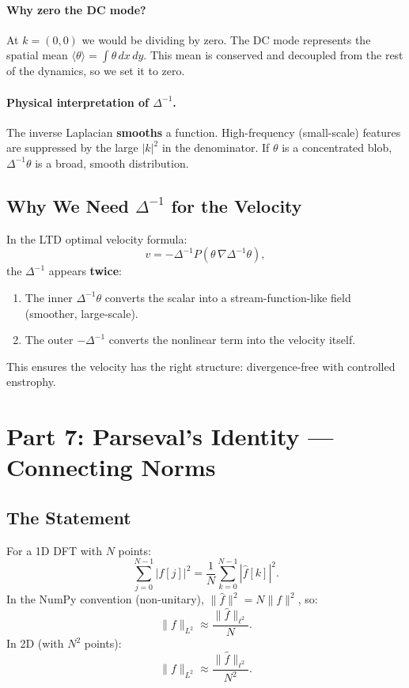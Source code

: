 \documentclass[12pt,a4paper]{article}
\newcommand{\lapinv}{\Delta^{-1}}
\theoremstyle{definition}
\begin{document}
\paragraph{Why zero the DC mode?}
At $k=(0,0)$ we would be dividing by zero.  The DC mode represents the spatial
mean $\langle\theta\rangle = \int\theta\,dx\,dy$.  This mean is conserved and
decoupled from the rest of the dynamics, so we set it to zero.

\paragraph{Physical interpretation of $\lapinv$.}
The inverse Laplacian \textbf{smooths} a function.  High-frequency
(small-scale) features are suppressed by the large $|k|^2$ in the denominator.
If $\theta$ is a concentrated blob, $\lapinv\theta$ is a broad, smooth
distribution.

\subsection{Why We Need $\lapinv$ for the Velocity}

In the LTD optimal velocity formula:
\[
  v = -\lapinv P\!\left(\theta\,\nabla\lapinv\theta\right),
\]
the $\lapinv$ appears \textbf{twice}:
\begin{enumerate}
  \item The inner $\lapinv\theta$ converts the scalar into a
    stream-function-like field (smoother, large-scale).
  \item The outer $-\lapinv$ converts the nonlinear term into the velocity
    itself.
\end{enumerate}
This ensures the velocity has the right structure: divergence-free with
controlled enstrophy.

\section{Part 7: Parseval's Identity — Connecting Norms}

\subsection{The Statement}

For a 1D DFT with $N$ points:
\[
  \sum_{j=0}^{N-1}|f[j]|^2 = \frac{1}{N}\sum_{k=0}^{N-1}|\hat{f}[k]|^2.
\]
In the NumPy convention (non-unitary), $\|\hat{f}\|^2 = N\|f\|^2$, so:
\[
  \|f\|_{L^2} \approx \frac{\|\hat{f}\|_{\ell^2}}{N}.
\]
In 2D (with $N^2$ points):
\begin{equation}
  \|f\|_{L^2} \approx \frac{\|\hat{f}\|_{\ell^2}}{N^2}.
\end{equation}
\end{document}

